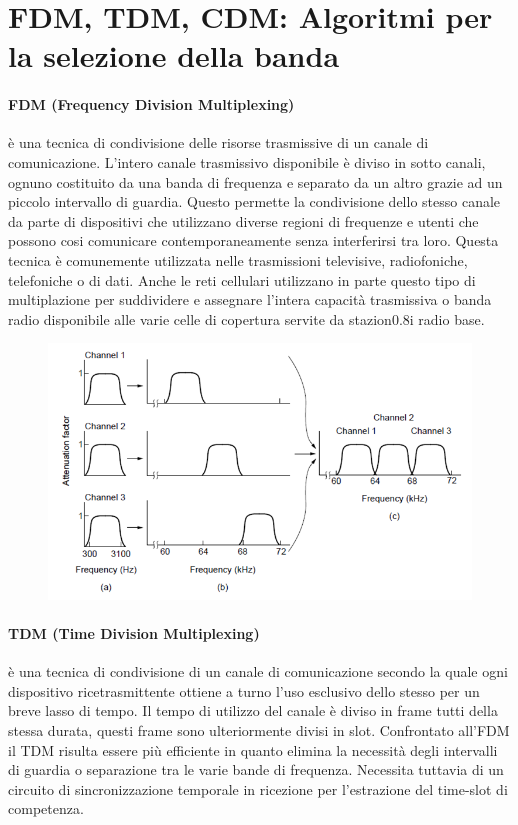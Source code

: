 \section{FDM, TDM, CDM: Algoritmi per la selezione della banda}

\paragraph{FDM (Frequency Division Multiplexing)} è una tecnica di condivisione delle risorse trasmissive di un canale di comunicazione. L’intero canale trasmissivo disponibile è diviso in sotto canali, ognuno costituito da una banda di frequenza e separato da un altro grazie ad un piccolo intervallo di guardia.
Questo permette la condivisione dello stesso canale da parte di dispositivi che utilizzano diverse regioni di frequenze e utenti che possono cosi comunicare contemporaneamente senza interferirsi tra loro.
Questa tecnica è comunemente utilizzata nelle trasmissioni televisive, radiofoniche, telefoniche o di dati. Anche le reti cellulari utilizzano in parte questo tipo di multiplazione per suddividere e assegnare l’intera capacità trasmissiva o banda radio disponibile alle varie celle di copertura servite da stazion0.8i radio base.

\begin{figure}[H]
\centering
\includegraphics[scale=0.45]{res/img/11_FDM.png}
\end{figure}
 
\paragraph{TDM (Time Division Multiplexing)} è una tecnica di condivisione di un canale di comunicazione secondo la quale ogni dispositivo ricetrasmittente ottiene a turno l’uso esclusivo dello stesso per un breve lasso di tempo. Il tempo di utilizzo del canale è diviso in frame tutti della stessa durata, questi frame sono ulteriormente divisi in slot.
Confrontato all’FDM il TDM risulta essere più efficiente in quanto elimina la necessità degli intervalli di guardia o separazione tra le varie bande di frequenza. Necessita tuttavia di un circuito di sincronizzazione temporale in ricezione per l’estrazione del time-slot di competenza.

